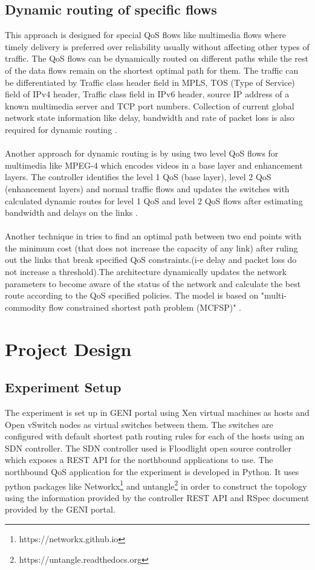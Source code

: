 \documentclass[paper=a4, fontsize=12pt]{scrartcl}	%
\numberwithin{equation}{section}		%
\numberwithin{figure}{section}			%
\numberwithin{table}{section}				%
\begin{document}
\subsection{Dynamic routing of specific flows}
This approach is designed for special QoS flows like multimedia flows where timely delivery is preferred over reliability usually without affecting other types of traffic. The QoS flows can be dynamically routed on different paths while the rest of the data flows remain on the shortest optimal path for them. The traffic can be differentiated by Traffic class header field in MPLS, TOS (Type of Service) field of IPv4 header, Traffic class field in IPv6 header, source IP address of a known multimedia server and TCP port numbers. Collection of current global network state information like delay, bandwidth and rate of packet loss is also required for dynamic routing \cite{openqos}.
\\
\\
Another approach for dynamic routing is by using two level QoS flows for multimedia like MPEG-4 which encodes videos in a base layer and enhancement layers. The controller identifies the level 1 QoS (base layer), level 2 QoS (enhancement layers) and normal traffic flows and updates the switches with calculated dynamic routes for level 1 QoS and level 2 QoS flows after estimating bandwidth and delays on the links \cite{video}.
\\
\\
Another technique in \cite{thesis} tries to find an optimal path between two end points with the minimum cost (that does not increase the capacity of any link) after ruling out the links that break specified QoS constraints.(i-e delay and packet loss do not increase a threshold).The architecture dynamically updates the network parameters to become aware of the status of the network and calculate the best route according to the QoS specified policies. The model is based on "multi-commodity flow constrained shortest path problem (MCFSP)" .

\section{Project Design}
\subsection{Experiment Setup}
The experiment is set up in GENI portal using Xen virtual machines as hosts and Open vSwitch nodes as virtual switches between them. The switches are configured with default shortest path routing rules for each of the hosts using an SDN controller. The SDN controller used is Floodlight open source controller which exposes a REST API for the northbound applications to use. The northbound QoS application for the experiment is developed in Python. It uses python packages like Networkx\footnote{https://networkx.github.io\label{networkx}} and untangle\footnote{https://untangle.readthedocs.org\label{untangle}} in order to construct the topology using the information provided by the controller REST API and RSpec document provided by the GENI portal. 
\end{document}
